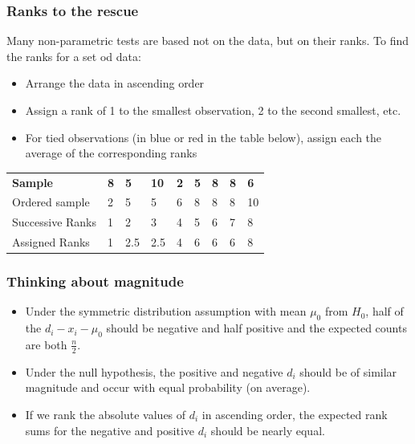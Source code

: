\documentclass[a4paper]{article}\usepackage[]{graphicx}\usepackage[]{xcolor}
\begin{document}
\subsubsection{Ranks to the rescue}
Many non-parametric tests are based not on the data, but on their \textcolor{mygreen}{ranks}.
To find the ranks for a set od data:
\begin{itemize}
	\item Arrange the data in ascending order
	\item Assign a rank of 1 to the smallest observation, 2 to the second smallest, etc.
	\item For tied observations (in \textcolor{mygreen}{blue} or \textcolor{myred}{red} in the table below), assign each the average of the corresponding ranks
\end{itemize}
\begin{table}[H]
	\centering
	\begin{tabular}{@{}lllllllll@{}}
	\textbf{Sample}  & \textcolor{myred}{\textbf{8}} & \textcolor{mygreen}{\textbf{5}} & \textbf{10} & \textbf{2} & \textcolor{mygreen}{\textbf{5}} & \textcolor{myred}{\textbf{8}} & \textcolor{myred}{\textbf{8}} & \textbf{6}  \\
	Ordered sample   & 2 & \textcolor{mygreen}{5} & \textcolor{mygreen}{5} & 6 & \textcolor{myred}{8} & \textcolor{myred}{8} & \textcolor{myred}{8} & 10 \\
	Successive Ranks & 1 & \textcolor{mygreen}{2} & \textcolor{mygreen}{3} & 4 & \textcolor{myred}{5} & \textcolor{myred}{6} & \textcolor{myred}{7} & 8  \\
	Assigned Ranks   & 1 & \textcolor{mygreen}{2.5} & \textcolor{mygreen}{2.5} & 4 & \textcolor{myred}{6} & \textcolor{myred}{6} & \textcolor{myred}{6} & 8 
	\end{tabular}
\end{table}
\subsubsection{Thinking about magnitude}
\begin{itemize}
	\item Under the symmetric distribution assumption with mean \( \mu_0 \) from \( H_0 \), half of the \( d_i - x_i - \mu_0 \) should be negative and half positive and the expected counts are both \( \frac{n}{2} \).
	\item Under the null hypothesis, the positive and negative \( d_i \) should be of similar magnitude and occur with equal probability (on average).
	\item If we rank the absolute values of \( d_i \) in ascending order, the expected rank sums for the negative and positive \( d_i \) should be nearly equal.
\end{itemize}
\end{document}
